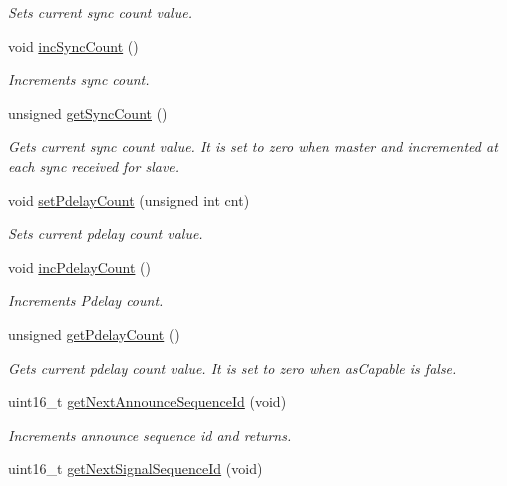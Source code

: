 \begin{DoxyCompactItemize}
\begin{DoxyCompactList}\small\item\em Sets current sync count value. \end{DoxyCompactList}\item 
void \hyperlink{class_common_port_adc84a20b20a67b0e1bb87313c7e923fd}{inc\+Sync\+Count} ()
\begin{DoxyCompactList}\small\item\em Increments sync count. \end{DoxyCompactList}\item 
unsigned \hyperlink{class_common_port_ae83aa3b2d155e97810ccccd57e9f13ca}{get\+Sync\+Count} ()
\begin{DoxyCompactList}\small\item\em Gets current sync count value. It is set to zero when master and incremented at each sync received for slave. \end{DoxyCompactList}\item 
void \hyperlink{class_common_port_aec03e751f24fcab6ae26789a1ae727ac}{set\+Pdelay\+Count} (unsigned int cnt)
\begin{DoxyCompactList}\small\item\em Sets current pdelay count value. \end{DoxyCompactList}\item 
void \hyperlink{class_common_port_a7d0d2b5b78e5c0847b37753bb359d6a4}{inc\+Pdelay\+Count} ()
\begin{DoxyCompactList}\small\item\em Increments Pdelay count. \end{DoxyCompactList}\item 
unsigned \hyperlink{class_common_port_acb83433716949af5f97d373d8ca6ee8d}{get\+Pdelay\+Count} ()
\begin{DoxyCompactList}\small\item\em Gets current pdelay count value. It is set to zero when as\+Capable is false. \end{DoxyCompactList}\item 
uint16\+\_\+t \hyperlink{class_common_port_a18883d9fb2db39824c9c291e142955f9}{get\+Next\+Announce\+Sequence\+Id} (void)
\begin{DoxyCompactList}\small\item\em Increments announce sequence id and returns. \end{DoxyCompactList}\item 
uint16\+\_\+t \hyperlink{class_common_port_abf938254e2cf21f85fbf20f1287e5e31}{get\+Next\+Signal\+Sequence\+Id} (void)

\end{DoxyCompactItemize}
